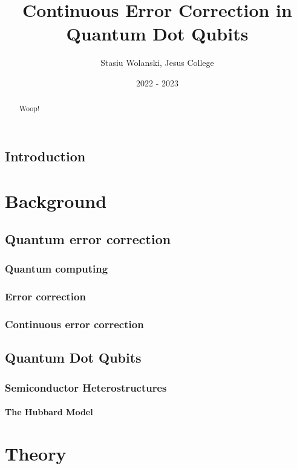 \documentclass{report}
\title{Continuous Error Correction in Quantum Dot Qubits}
\author{Stasiu Wolanski, Jesus College}
\date{2022 - 2023}
\begin{document}
\maketitle

\begin{abstract}
    Woop!
\end{abstract}

\tableofcontents

\section{Introduction}
\chapter{Background}

\section{Quantum error correction}
\subsection{Quantum computing}
\subsection{Error correction}
\subsection{Continuous error correction}


\section{Quantum Dot Qubits}
\subsection{Semiconductor Heterostructures}
\subsubsection{The Hubbard Model} \label{sec:hubbard_model}

\chapter{Theory}
\end{document}
